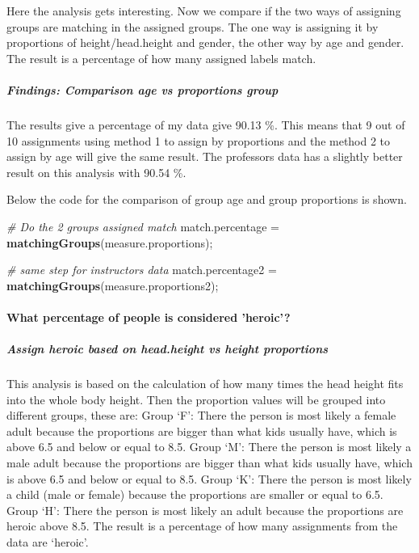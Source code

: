 \documentclass[]{article}
\newenvironment{Shaded}{\begin{snugshade}}{\end{snugshade}}
\newcommand{\CommentTok}[1]{\textcolor[rgb]{0.56,0.35,0.01}{\textit{#1}}}
\newcommand{\KeywordTok}[1]{\textcolor[rgb]{0.13,0.29,0.53}{\textbf{#1}}}
\newcommand{\NormalTok}[1]{#1}
\newcommand{\StringTok}[1]{\textcolor[rgb]{0.31,0.60,0.02}{#1}}
\begin{document}
Here the analysis gets interesting. Now we compare if the two ways of
assigning groups are matching in the assigned groups. The one way is
assigning it by proportions of height/head.height and gender, the other
way by age and gender. The result is a percentage of how many assigned
labels match.

\subparagraph{Findings: Comparison age vs proportions group}
\label{sec:appendix-findings-comparison-age-vs-proportions-group}

The results give a percentage of my data give 90.13 \%. This means that
9 out of 10 assignments using method 1 to assign by proportions and the
method 2 to assign by age will give the same result. The professors data
has a slightly better result on this analysis with 90.54 \%.

Below the code for the comparison of group age and group proportions is
shown.

\begin{Shaded}
\begin{Highlighting}[]
\CommentTok{\# Do the 2 groups assigned match}
\NormalTok{match.percentage =}\StringTok{ }\KeywordTok{matchingGroups}\NormalTok{(measure.proportions);}

\CommentTok{\# same step for instructors data}
\NormalTok{match.percentage2 =}\StringTok{ }\KeywordTok{matchingGroups}\NormalTok{(measure.proportions2);}
\end{Highlighting}
\end{Shaded}

\newpage

\paragraph{What percentage of people is considered 'heroic'?}
\label{sec:appendix-heroic}

\subparagraph{Assign heroic based on head.height vs height proportions}
\label{sec:appendix-heroic-proportions}

This analysis is based on the calculation of how many times the head
height fits into the whole body height. Then the proportion values will
be grouped into different groups, these are: Group `F': There the person
is most likely a female adult because the proportions are bigger than
what kids usually have, which is above 6.5 and below or equal to 8.5.
Group `M': There the person is most likely a male adult because the
proportions are bigger than what kids usually have, which is above 6.5
and below or equal to 8.5. Group `K': There the person is most likely a
child (male or female) because the proportions are smaller or equal to
6.5. Group `H': There the person is most likely an adult because the
proportions are heroic above 8.5. The result is a percentage of how many
assignments from the data are `heroic'.
\end{document}
